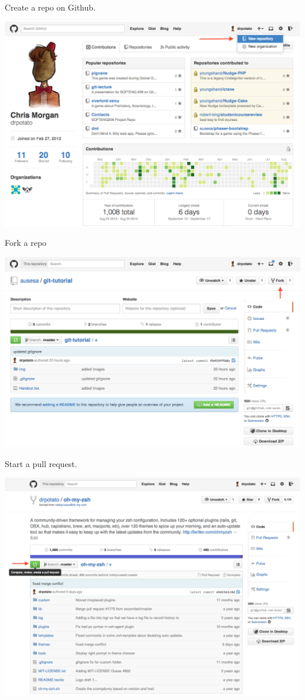 \documentclass{tufte-handout}
\begin{document}
Create a repo on Github.

\includegraphics[scale=0.4]{img/github-create-repo.png}

Fork a repo

\includegraphics[scale=0.4]{img/github-fork.png}

\pagebreak
Start a pull request.

\includegraphics[scale=0.4]{img/github-start-pull-request.png}
\end{document}
